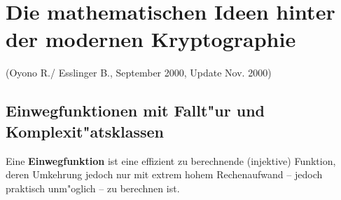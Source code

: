 \setcounter{satz}{0}
\setcounter{definition}{0}

\newcommand{\NT}{\vspace*{0.2\baselineskip}\\}
\newcommand{\HZ}{\vspace*{0.5\baselineskip}}
\newcommand{\R}{\text{I}\!\text{R}}
\newcommand{\N}{\text{I}\!\text{N}}
\newcommand{\Q}{\text{Q}\!\!\!\text{l}\,\,}
\newcommand{\C}{\text{C}\!\!\!\text{l}\,\,}
\newcommand{\K}{\text{I}\!\text{K}}
\newcommand{\Z}{\mathbf{\mathbb{Z}}}
\newcommand{\fs}{\mathscr{F}}  
\newcommand{\es}{\mathscr{E}}  
\newcommand{\cs}{\mathscr{C}}  
\newcommand{\gs}{\mathscr{G}}
\newcommand{\is}{\mathscr{I}}
\newcommand{\os}{\mathscr{O}}
\newcommand{\ks}{\mathscr{K}}
\newcommand{\qs}{\mathscr{Q}}
\newcommand{\us}{\mathscr{U}}
\newcommand{\hs}{\mathscr{H}}
\newcommand{\ps}{\mathscr{P}}
\newcommand{\as}{\mathscr{A}}
\newcommand{\rs}{\mathscr{R}}
\newcommand{\bs}{\mathscr{B}}
\newcommand{\PG}{\text{I}\!\text{P}}
\newcommand{\carre}{\square}
\newcommand{\ncarre}{/\negthickspace\negthickspace\square}
\newcommand{\ncarreq}{{\ncarre}_q}
\newcommand{\ncarree}{/\negthickspace\negthickspace\negthickspace\square}
\newcommand{\ncarrepi}{{\ncarre}_{p^i}}
\newcommand{\mc}[1]{{\cal #1}}
\newcommand{\Char}{\text{char}}
\newcommand{\Aut}{\text{Aut}}
\newcommand{\Fix}{\text{Fix}}
\newcommand{\Syl}{\text{Syl}}
\newcommand{\Bild}{\text{Bild}}
\newcommand{\ggt}{\text{ggT}}
\newcommand{\kgv}{\text{kgV}}
\newcommand{\Id}{\text{Id}}
\newcommand{\nqcarre}{{\ncarre}_{q^2}}

\setlength{\fboxrule}{.4pt}
\setlength{\fboxsep}{4pt}

\newpage
\section{Die mathematischen Ideen hinter der modernen Kryptographie}
(Oyono R./ Esslinger B., September 2000, Update Nov. 2000)
       \subsection{Einwegfunktionen mit Fallt"ur und Komplexit"atsklassen}
 
Eine {\bf Einwegfunktion} \hypertarget{Einwegfunktionen1}{} ist eine effizient zu 
berechnende (injektive) Funktion, deren Umkehrung jedoch nur mit 
extrem hohem Rechenaufwand -- jedoch praktisch unm"oglich -- zu berechnen ist.\par

